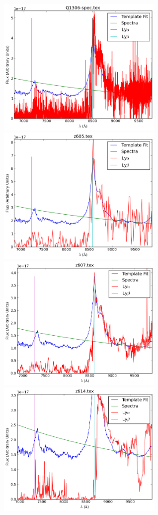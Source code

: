 \documentclass[11pt]{article}
\begin{document}
\begin{figure}[h]
  \centering
  \includegraphics[width=8cm]{Q1306-spec.png}
  \includegraphics[width=8cm]{z605.png}
  \includegraphics[width=8cm]{z607.png}
  \includegraphics[width=8cm]{z614.png}

\end{figure}
\end{document}
